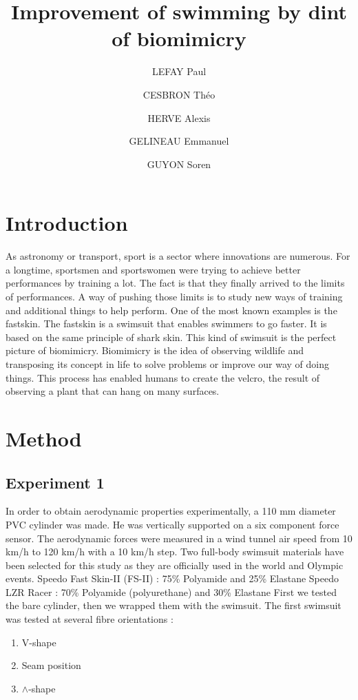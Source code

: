 \documentclass[twoside,twocolumn]{article}                          %
\title{Improvement of swimming by dint of biomimicry}               %
\author[3]{LEFAY Paul}                                              %
\author[1]{CESBRON Théo}
\author[2]{HERVE Alexis}
\author[2]{GELINEAU Emmanuel}
\author[2]{GUYON Soren}
\affil[1]{BIO}                                                     %
\affil[2]{EOC}
\affil[3]{CSS}
\begin{document}
\renewcommand\thesection{\Roman{section}}                           %
\renewcommand\thesubsection{\roman{subsection}}                     %


\cfoot{\thepage}

\maketitle{}										                                    %

\newpage
\section{Introduction}
As astronomy or transport, sport is a sector where innovations are numerous. For a longtime, sportsmen and sportswomen were trying to achieve better performances by training a lot. The fact is that they finally arrived to the limits of performances. A way of pushing those limits is to study new ways of training and additional things to help perform. One of the most known examples is the fastskin. The fastskin is a swimsuit that enables swimmers to go faster. It is based on the same principle of shark skin.
This kind of swimsuit is the perfect picture of biomimicry. Biomimicry is the idea of observing wildlife and transposing its concept in life to solve problems or improve our way of doing things. This process has enabled humans to create the velcro, the result of observing a plant that can hang on many surfaces.


\section{Method}
\subsection{Experiment 1}
In order to obtain aerodynamic properties experimentally, a 110 mm diameter PVC cylinder was made. He was vertically supported on a six component force sensor. The aerodynamic forces were measured in a wind tunnel air speed from 10 km/h to 120 km/h with a 10 km/h step. Two full-body swimsuit materials have been selected for this study as they are officially used in the world and Olympic events.
Speedo Fast Skin-II (FS-II) : 75\% Polyamide and 25\% Elastane 
Speedo LZR Racer :  70\% Polyamide (polyurethane) and 30\% Elastane 
First we tested the bare cylinder, then we wrapped them with the swimsuit. The first swimsuit was tested at several fibre orientations :
\begin{enumerate}
  \item V-shape
  \item Seam position
  \item $\wedge$-shape
\end{enumerate}
\end{document}

